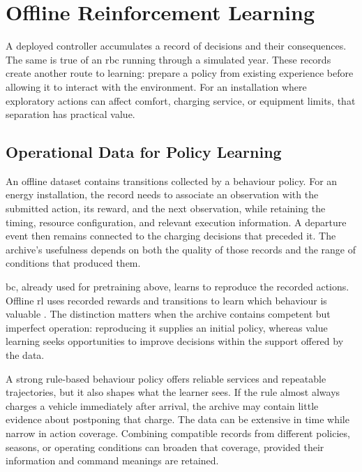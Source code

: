 \section{Offline Reinforcement Learning}
\label{sec:control-offline}

A deployed controller accumulates a record of decisions and their consequences. The same is true of an \gls{rbc} running through a simulated year. These records create another route to learning: prepare a policy from existing experience before allowing it to interact with the environment. For an installation where exploratory actions can affect comfort, charging service, or equipment limits, that separation has practical value.

\begin{center}
\end{center}

\subsection{Operational Data for Policy Learning}

An offline dataset contains transitions collected by a behaviour policy. For an energy installation, the record needs to associate an observation with the submitted action, its reward, and the next observation, while retaining the timing, resource configuration, and relevant execution information. A departure event then remains connected to the charging decisions that preceded it. The archive's usefulness depends on both the quality of those records and the range of conditions that produced them.

\gls{bc}, already used for pretraining above, learns to reproduce the recorded actions. Offline \gls{rl} uses recorded rewards and transitions to learn which behaviour is valuable \parencite{levine2020offline}. The distinction matters when the archive contains competent but imperfect operation: reproducing it supplies an initial policy, whereas value learning seeks opportunities to improve decisions within the support offered by the data.

A strong rule-based behaviour policy offers reliable services and repeatable trajectories, but it also shapes what the learner sees. If the rule almost always charges a vehicle immediately after arrival, the archive may contain little evidence about postponing that charge. The data can be extensive in time while narrow in action coverage. Combining compatible records from different policies, seasons, or operating conditions can broaden that coverage, provided their information and command meanings are retained.


